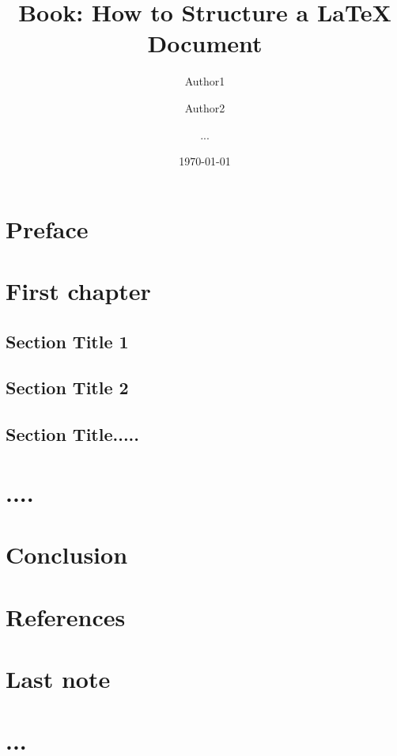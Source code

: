 \documentclass[11pt,a4paper]{book}
\begin{document}
\title{Book: How to Structure a LaTeX Document}
\author{Author1 \and Author2 \and ...}
\date{\today}

\maketitle

\frontmatter

\chapter{Preface}

\mainmatter
\chapter{First chapter}
\section{Section Title 1}
\section{Section Title 2}

\section{Section Title.....}

\chapter{....}

\chapter{Conclusion}

\chapter*{References}


\backmatter
\chapter{Last note}

\chapter{...}
\end{document}
